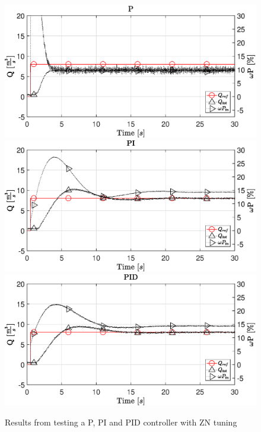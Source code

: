 \begin{figure}[H]
    \centering
    \includegraphics[width=\textwidth]{figures/07controllerDesign/Ptest.eps}
    \includegraphics[width=\textwidth]{figures/07controllerDesign/PItest.eps}
    \includegraphics[width=\textwidth]{figures/07controllerDesign/PIDtest.eps}
    \caption{Results from testing a P, PI and PID controller with ZN tuning}
	\label{fig:PIDtest}
\end{figure}

